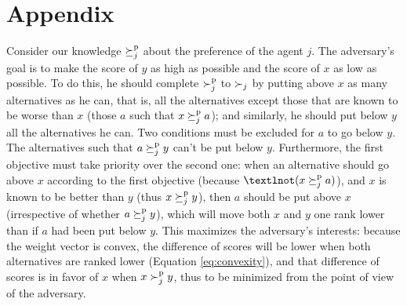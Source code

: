 \documentclass{article}
\begin{document}



% 
%

\newpage




\newpage
\appendix
\section{Appendix}
\begin{sketch*}
	Consider our knowledge $\succeq^\text{p}_j$ about the preference of the agent $j$. 
	The adversary's goal is to make the score of $y$ as high as possible and the score of $x$ as low as possible. 
	To do this, he should complete $\succ^\text{p}_j$ to $\succ_j$ by putting above $x$ as many alternatives as he can, that is, all the alternatives except those that are known to be worse than $x$ (those $a$ such that $x \succeq^\text{p}_j a$); and similarly, he should put below $y$ all the alternatives he can. Two conditions must be excluded for $a$ to go below $y$. The alternatives such that $a \succeq^\text{p}_j y$ can’t be put below $y$.
	Furthermore, the first objective must take priority over the second one: when an alternative should go above $x$ according to the first objective (because $¬(x \pprefeq_j a)$), and $x$ is known to be better than $y$ (thus $x \succeq^\text{p}_j y$), then $a$ should be put above $x$ (irrespective of whether $a \succeq^\text{p}_j y$), which will move both $x$ and $y$ one rank lower than if $a$ had been put below $y$. 
	This maximizes the adversary’s interests: because the weight vector is convex, the difference of scores will be lower when both alternatives are ranked lower (Equation \ref{eq:convexity}), and that difference of scores is in favor of $x$ when $x \succ^\text{p}_j y$, thus to be minimized from the point of view of the adversary.
\end{sketch*}
\end{document}
